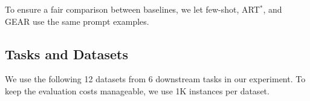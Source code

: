 \documentclass[11pt]{article}
\newcommand{\daniel}[1]{{\color{purple}[DK: #1]}}
\newcommand{\yiningchange}[2]{{\color{ForestGreen}{\st{#1}}{#2}}}
\newcommand{\name}{{\fontfamily{cmss}\selectfont GEAR}}
\begin{document}
To ensure a fair comparison between baselines, we let few-shot, ART$^\ast$, and \name{} use the same prompt examples.



\subsection{Tasks and Datasets} 
\label{subsec:datasets}
We use the following 12 datasets from 6 downstream tasks in our experiment. 
To keep the evaluation costs manageable, we use 1K instances per dataset.
\end{document}
